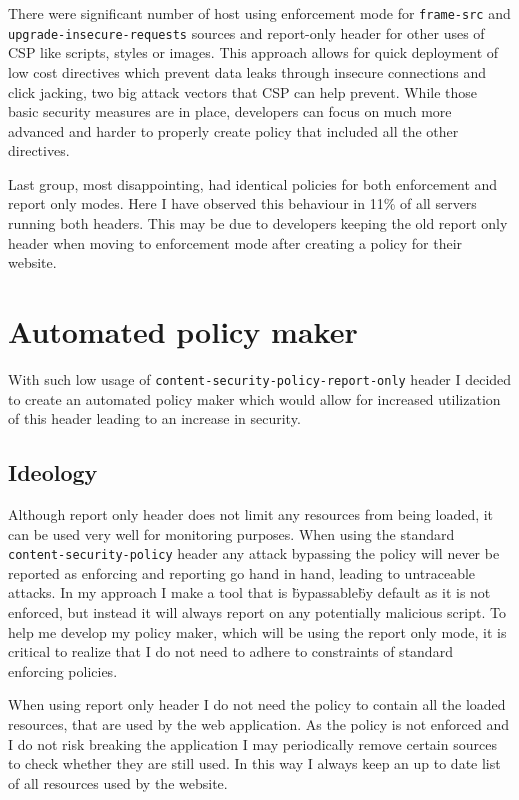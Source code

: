 There were significant number of host using enforcement mode for \texttt{frame-src} and \texttt{upgrade-insecure-requests} sources and report-only header for other uses of CSP like scripts, styles or images.
This approach allows for quick deployment of low cost directives which prevent data leaks through insecure connections and click jacking, two big attack vectors that CSP can help prevent.
While those basic security measures are in place, developers can focus on much more advanced and harder to properly create policy that included all the other directives.

Last group, most disappointing, had identical policies for both enforcement and report only modes.
Here I have observed this behaviour in 11\% of all servers running both headers.
This may be due to developers keeping the old report only header when moving to enforcement mode after creating a policy for their website.

\section{Automated policy maker}

With such low usage of \texttt{content-security-policy-report-only} header I decided to create an automated policy maker which would allow for increased utilization of this header leading to an increase in security.

\subsection{Ideology}

Although report only header does not limit any resources from being loaded, it can be used very well for monitoring purposes.
When using the standard \texttt{content-security-policy} header any attack bypassing the policy will never be reported as enforcing and reporting go hand in hand, leading to untraceable attacks.
In my approach I make a tool that is \"bypassable\" by default as it is not enforced, but instead it will always report on any potentially malicious script.
To help me develop my policy maker, which will be using the report only mode, it is critical to realize that I do not need to adhere to constraints of standard enforcing policies.

When using report only header I do not need the policy to contain all the loaded resources, that are used by the web application.
As the policy is not enforced and I do not risk breaking the application I may periodically remove certain sources to check whether they are still used.
In this way I always keep an up to date list of all resources used by the website.

